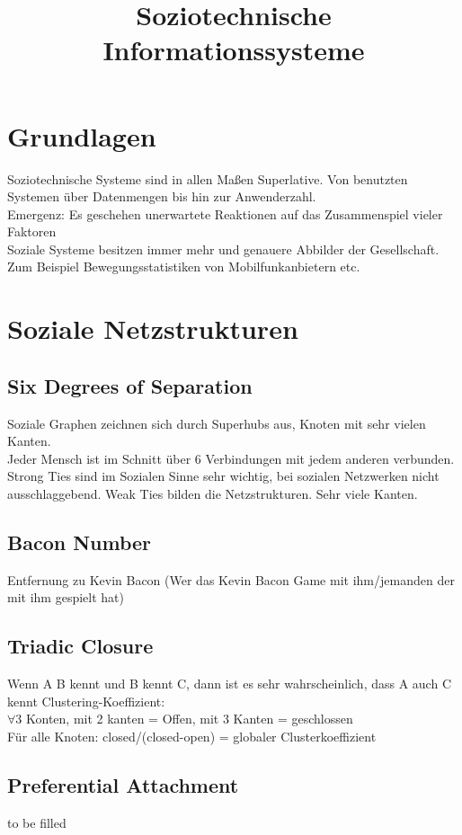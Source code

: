 \documentclass[a4paper]{article}
\begin{document}
\title{Soziotechnische Informationssysteme}
\maketitle
\section{Grundlagen}
Soziotechnische Systeme sind in allen Maßen Superlative. Von benutzten Systemen über Datenmengen bis hin zur Anwenderzahl.\\
Emergenz: Es geschehen unerwartete Reaktionen auf das Zusammenspiel vieler Faktoren\\
Soziale Systeme besitzen immer mehr und genauere Abbilder der Gesellschaft. Zum Beispiel Bewegungsstatistiken von Mobilfunkanbietern etc.\\
\section{Soziale Netzstrukturen}
\subsection{Six Degrees of Separation}
Soziale Graphen zeichnen sich durch Superhubs aus, Knoten mit sehr vielen Kanten.\\
Jeder Mensch ist im Schnitt über 6 Verbindungen mit jedem anderen verbunden.\\
Strong Ties sind im Sozialen Sinne sehr wichtig, bei sozialen Netzwerken nicht ausschlaggebend. Weak Ties bilden die Netzstrukturen. 
Sehr viele Kanten.
\subsection{Bacon Number}
Entfernung zu Kevin Bacon (Wer das Kevin Bacon Game mit ihm/jemanden der mit ihm gespielt hat)
\subsection{Triadic Closure}
Wenn A B kennt und B kennt C, dann ist es sehr wahrscheinlich, dass A auch C kennt
Clustering-Koeffizient:\\
$\forall$3 Konten, mit 2 kanten = Offen, mit 3 Kanten = geschlossen\\
Für alle Knoten: closed/(closed-open) = globaler Clusterkoeffizient\\
\subsection{Preferential Attachment}
to be filled
\end{document}
